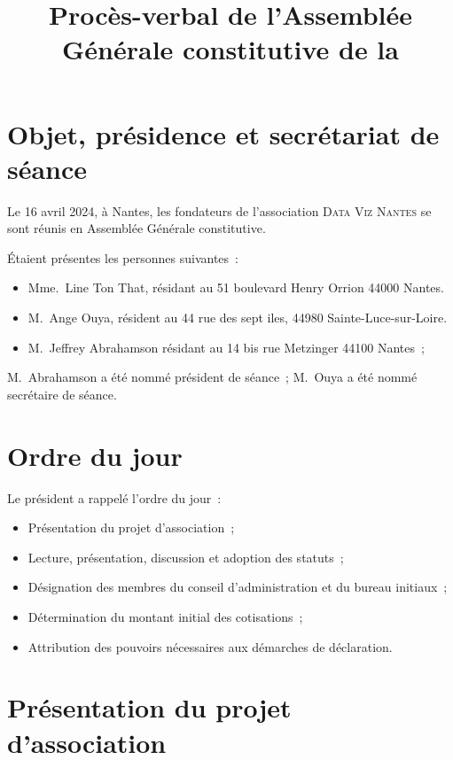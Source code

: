 \documentclass[12pt]{article}
\title{Procès-verbal de l'Assemblée Générale constitutive de la \Nom}
\date{}
\newcommand{\quand}{16 avril 2024}
\newcommand{\Nom}{\textsc{Data Viz Nantes}}
\begin{document}
\maketitle

\section{Objet, présidence et secrétariat de séance}
\label{sec:objet}

Le \quand, à Nantes, les fondateurs de l'association \Nom{} se
sont réunis en Assemblée Générale constitutive.

Étaient présentes les personnes suivantes :

\begin{itemize}
\item Mme.~Line Ton That, résidant au 51 boulevard Henry Orrion 44000 Nantes.
\item M.~Ange Ouya, résident au 44 rue des sept iles, 44980 Sainte-Luce-sur-Loire.
\item M.~Jeffrey Abrahamson résidant au 14 bis rue Metzinger 44100
  Nantes ;
\end{itemize}

M.~Abrahamson a été nommé président de séance ; M.~Ouya a été nommé
secrétaire de séance.

\section{Ordre du jour}
\label{sec:ordre-du-jour}

Le président a rappelé l'ordre du jour :

\begin{itemize}
\item Présentation du projet d'association ;
\item Lecture, présentation, discussion et adoption des statuts ;
\item Désignation des membres du conseil d'administration et du bureau
  initiaux ;
\item Détermination du montant initial des cotisations ;
\item Attribution des pouvoirs nécessaires aux démarches de déclaration.
\end{itemize}

\section{Présentation du projet d'association}
\label{sec:presentation-du-projet-d-association}
\end{document}
